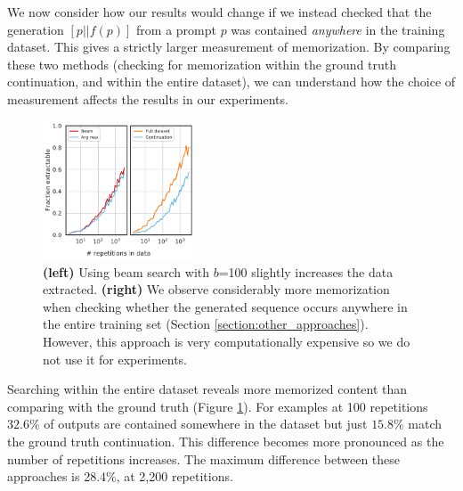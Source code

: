 We now consider how our results would change if we instead checked that the generation $[p || f(p)]$ from a prompt $p$ was contained \emph{anywhere} in the training dataset. This gives a strictly larger measurement of memorization.
By comparing these two methods (checking for memorization within the ground truth continuation, and within the entire dataset), we can understand how the choice of measurement affects the results in our experiments. 



\begin{figure}[h]
    \centering
    \includegraphics[width=0.4\textwidth]{figures/beam_search_and_overall} %
    \caption{
    \textbf{(left)} Using beam search with $b$=100 slightly increases the data extracted. 
    \textbf{(right)} We observe considerably more memorization when checking whether the generated sequence occurs anywhere in the entire training set (Section \ref{section:other_approaches}). However, this approach is very computationally expensive so we do not use it for experiments.
    }
    \label{fig:other_approaches_search}
\end{figure}

Searching within the entire dataset reveals more memorized content than comparing with the ground truth (Figure \ref{fig:other_approaches_search}). 
For examples at 100 repetitions $32.6\%$ of outputs are contained somewhere in the dataset but just $15.8\%$ match the ground truth continuation.
This difference becomes more pronounced as the number of repetitions increases. 
The maximum difference between these approaches is 28.4\%, at 2{,}200 repetitions.

